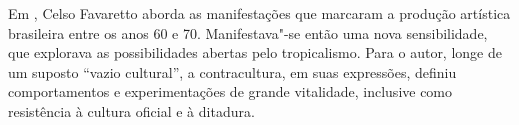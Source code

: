 \medskip

\noindent{}Em {}, Celso Favaretto aborda as manifestações que marcaram a produção artística brasileira entre os anos 60 e 70. Manifestava"-se então uma nova sensibilidade, que explorava as possibilidades abertas pelo tropicalismo. Para o autor, longe de um suposto “vazio cultural”, a contracultura, em suas expressões, definiu comportamentos e experimentações de grande vitalidade, inclusive como resistência à cultura oficial e à ditadura.

\vfill

\hspace*{-.4cm}\begin{minipage}[c]{1\linewidth}
\small{
{}}
\end{minipage}

\pagebreak